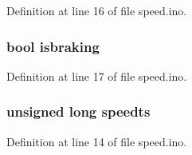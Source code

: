 Definition at line 16 of file speed.\+ino.

\subsubsection[{\texorpdfstring{isbraking}{isbraking}}]{\setlength{\rightskip}{0pt plus 5cm}bool isbraking}\hypertarget{group__speed_gad13fd9ed7295daa9a51dd2fade080e50}{}\label{group__speed_gad13fd9ed7295daa9a51dd2fade080e50}


Definition at line 17 of file speed.\+ino.

\subsubsection[{\texorpdfstring{speedts}{speedts}}]{\setlength{\rightskip}{0pt plus 5cm}unsigned long speedts}\hypertarget{group__speed_ga605bafc427aaa8e9718a112441ba88a7}{}\label{group__speed_ga605bafc427aaa8e9718a112441ba88a7}


Definition at line 14 of file speed.\+ino.


